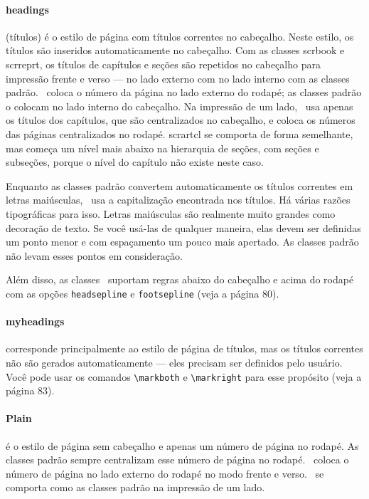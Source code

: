 \paragraph{headings} (títulos) é o estilo de página com títulos correntes no cabeçalho. Neste estilo, os títulos são inseridos automaticamente no cabeçalho. Com as classes scrbook e scrreprt, os títulos de capítulos e seções são repetidos no cabeçalho para impressão frente e verso — no lado externo com \KOMAScript no lado interno com as classes padrão. \KOMAScript\ coloca o número da página no lado externo do rodapé; as classes padrão o colocam no lado interno do cabeçalho. Na impressão de um lado, \KOMAScript\ usa apenas os títulos dos capítulos, que são centralizados no cabeçalho, e coloca os números das páginas centralizados no rodapé. scrartcl se comporta de forma semelhante, mas começa um nível mais abaixo na hierarquia de seções, com seções e subseções, porque o nível do capítulo não existe neste caso.

Enquanto as classes padrão convertem automaticamente os títulos correntes em letras maiúsculas, \KOMAScript\ usa a capitalização encontrada nos títulos. Há várias razões tipográficas para isso. Letras maiúsculas são realmente muito grandes como decoração de texto. Se você usá-las de qualquer maneira, elas devem ser definidas um ponto menor e com espaçamento um pouco mais apertado. As classes padrão não levam esses pontos em consideração.

Além disso, as classes \KOMAScript\ suportam regras abaixo do cabeçalho e acima do rodapé com as opções \texttt{headsepline} e \texttt{footsepline} (veja a página 80).

\paragraph{myheadings} corresponde principalmente ao estilo de página de títulos, mas os títulos correntes não são gerados automaticamente --- eles precisam ser definidos pelo usuário. Você pode usar os comandos \verb|\markboth| e \verb|\markright| para esse propósito (veja a página 83).

\paragraph{Plain} é o estilo de página sem cabeçalho e apenas um número de página no rodapé. As classes padrão sempre centralizam esse número de página no rodapé. \KOMAScript\ coloca o número de página no lado externo do rodapé no modo frente e verso. \KOMAScript\ se comporta como as classes padrão na impressão de um lado.

